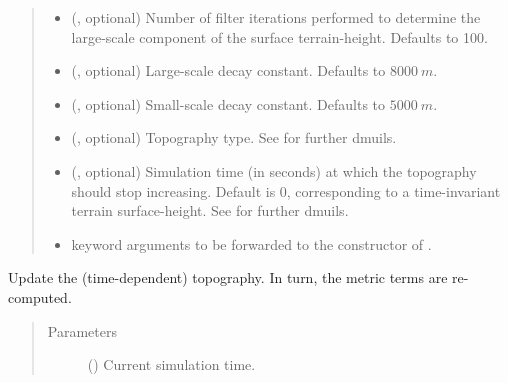 \documentclass[letterpaper,10pt,english]{sphinxmanual}
\begin{document}
\begin{fulllineitems}
\begin{fulllineitems}
\begin{quote}
\begin{description}
\begin{itemize}
\item {} 
 (, optional) \textendash{} Number of filter iterations performed to determine the
large-scale component of the surface terrain-height. Defaults to 100.

\item {} 
 (, optional) \textendash{} Large-scale decay constant. Defaults to \(8000 ~ m\).

\item {} 
 (, optional) \textendash{} Small-scale decay constant. Defaults to \(5000 ~ m\).

\item {} 
 (, optional) \textendash{} Topography type. See {\hyperref[\detokenize{api:module-grids.topography}]{}}
for further dmuils.

\item {} 
 (, optional) \textendash{} Simulation time (in seconds) at which the topography
should stop increasing. Default is 0, corresponding to a time-invariant terrain
surface-height. See {\hyperref[\detokenize{api:module-grids.topography}]{}} for further dmuils.

\item {} 
 \textendash{} keyword arguments to be forwarded to the constructor of
{\hyperref[\detokenize{api:grids.topography.Topography2d}]{}}.

\end{itemize}

\end{description}\end{quote}

\end{fulllineitems}


\begin{fulllineitems}
\label{\detokenize{api:grids.sleve.SLEVE3d.update_topography}}
Update the (time-dependent) topography. In turn, the metric terms are re-computed.
\begin{quote}\begin{description}
\item[{Parameters}] \leavevmode
{} () \textendash{} Current simulation time.

\end{description}\end{quote}

\end{fulllineitems}


\end{fulllineitems}
\end{document}
